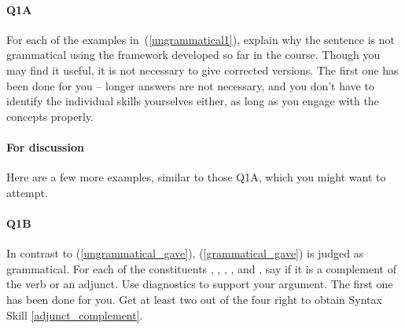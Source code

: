 \documentclass{article}
\begin{document}
\paragraph{Q1A} For each of the examples in~(\ref{ungrammatical1}), explain why the sentence is not grammatical using the framework developed so far in the course.
Though you may find it useful, it is not necessary to give corrected versions. The first one has been done for you -- longer answers are not necessary, and you don't have to identify the individual skills yourselves either, as long as you engage with the concepts properly.
\begin{exe}
    \label{ungrammatical1}
\end{exe}

\paragraph{For discussion} Here are a few more examples, similar to those Q1A, which you might want to attempt.
\ea
        \label{ungrammatical_gave}
        \label{intransitive_like}
        \label{ditransitive_like}
        \z
        \label{ungrammatical2}
\z

\paragraph{Q1B} In contrast to (\ref{ungrammatical_gave}), (\ref{grammatical_gave}) is judged as grammatical.
For each of the constituents , , , , and , say if it is a complement of the verb or an adjunct. Use diagnostics to support your argument. The first one has been done for you. Get at least two out of the four right to obtain Syntax Skill \ref{adjunct_complement}.
\begin{exe}
    \label{grammatical_gave}
\end{exe}
\end{document}

